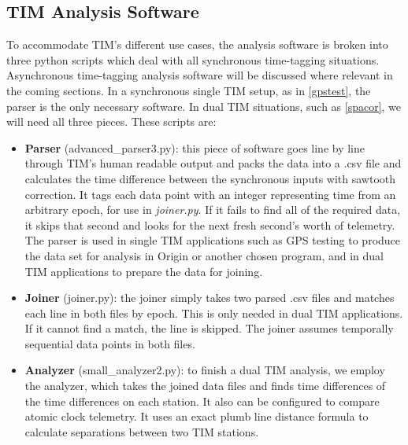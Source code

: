 \subsection{TIM Analysis Software}
\label{timanalysis}
To accommodate TIM's different use cases, the analysis software is broken into three python scripts which deal with all synchronous time-tagging situations. Asynchronous time-tagging analysis software will be discussed where relevant in the coming sections. In a synchronous single TIM setup, as in \autoref{gpstest}, the parser is the only necessary software. In dual TIM situations, such as \autoref{spacor}, we will need all three pieces. These scripts are:
\begin{itemize}
	\item \textbf{Parser} (advanced\_parser3.py): this piece of software goes line by line through TIM's human readable output and packs the data into a .csv file and calculates the time difference between the synchronous inputs with sawtooth correction. It tags each data point with an integer representing time from an arbitrary epoch, for use in \textit{joiner.py}. If it fails to find all of the required data, it skips that second and looks for the next fresh second's worth of telemetry. The parser is used in single TIM applications such as GPS testing to produce the data set for analysis in Origin or another chosen program, and in dual TIM applications to prepare the data for joining.

	\item \textbf{Joiner} (joiner.py): the joiner simply takes two parsed .csv files and matches each line in both files by epoch. This is only needed in dual TIM applications. If it cannot find a match, the line is skipped. The joiner assumes temporally sequential data points in both files.

	\item \textbf{Analyzer} (small\_analyzer2.py): to finish a dual TIM analysis, we employ the analyzer, which takes the joined data files and finds time differences of the time differences on each station. It also can be configured to compare atomic clock telemetry. It uses an exact plumb line distance formula to calculate separations between two TIM stations. 
\end{itemize}

